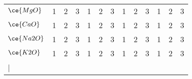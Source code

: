 \begin{table*}[]
{\begin{tabular}{|l|ccc|ccc|ccc|ccc|}
$\ce{MgO}$   & \multicolumn{1}{c}{1}     & \multicolumn{1}{c}{2}      & \multicolumn{1}{c}{3}     & \multicolumn{1}{c}{1}     & \multicolumn{1}{c}{2}      & \multicolumn{1}{c}{3}     & \multicolumn{1}{c}{1}     & \multicolumn{1}{c}{2}      & \multicolumn{1}{c}{3}     & \multicolumn{1}{c}{1}     & \multicolumn{1}{c}{2}      & 3                          \\
$\ce{CaO}$   & \multicolumn{1}{c}{1}     & \multicolumn{1}{c}{2}      & \multicolumn{1}{c}{3}     & \multicolumn{1}{c}{1}     & \multicolumn{1}{c}{2}      & \multicolumn{1}{c}{3}     & \multicolumn{1}{c}{1}     & \multicolumn{1}{c}{2}      & \multicolumn{1}{c}{3}     & \multicolumn{1}{c}{1}     & \multicolumn{1}{c}{2}      & 3                          \\
$\ce{Na2O}$  & \multicolumn{1}{c}{1}     & \multicolumn{1}{c}{2}      & \multicolumn{1}{c}{3}     & \multicolumn{1}{c}{1}     & \multicolumn{1}{c}{2}      & \multicolumn{1}{c}{3}     & \multicolumn{1}{c}{1}     & \multicolumn{1}{c}{2}      & \multicolumn{1}{c}{3}     & \multicolumn{1}{c}{1}     & \multicolumn{1}{c}{2}      & 3                          \\
$\ce{K2O}$   & \multicolumn{1}{c}{1}     & \multicolumn{1}{c}{2}      & \multicolumn{1}{c}{3}     & \multicolumn{1}{c}{1}     & \multicolumn{1}{c}{2}      & \multicolumn{1}{c}{3}     & \multicolumn{1}{c}{1}     & \multicolumn{1}{c}{2}      & \multicolumn{1}{c}{3}     & \multicolumn{1}{c}{1}     & \multicolumn{1}{c}{2}      & 3                          \\
|\end{tabular}%
}
\end{table*}